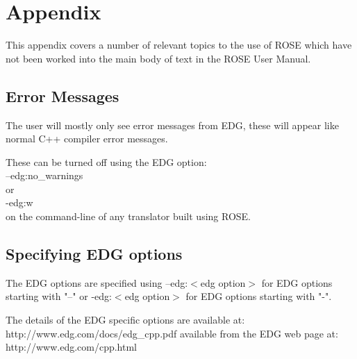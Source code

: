 
\chapter{ Appendix }

% 

   This appendix covers a number of relevant topics to the use of ROSE
which have not been worked into the main body of text in the ROSE User Manual.


\section {Error Messages}

   The user will mostly only see error messages from EDG, these will
appear like normal C++ compiler error messages.

   These can be turned off using the EDG option: \\
   --edg:no\_warnings \\
or \\
   -edg:w \\
on the command-line of any translator built using ROSE.

\section {Specifying EDG options}

   The EDG options are specified using --edg:$<$edg option$>$ for EDG options starting 
with "--" or -edg:$<$edg option$>$ for EDG options starting with "-".

The details of the EDG specific options are available at: \\
    http://www.edg.com/docs/edg\_cpp.pdf
available from the EDG web page at:\\
    http://www.edg.com/cpp.html

